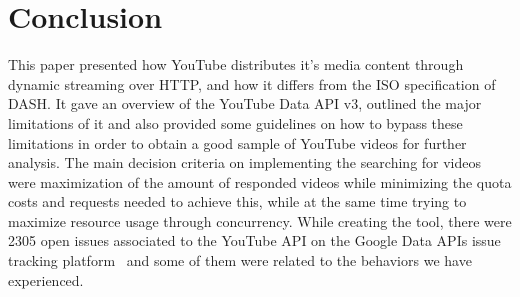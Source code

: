 \section{Conclusion}
This paper presented how
YouTube distributes it's media content through dynamic streaming over HTTP, and how it
differs from the ISO specification of DASH. It gave an overview of the YouTube
Data API v3, outlined the major limitations of it and also provided some
guidelines on how to bypass these limitations in order to obtain a good sample
of YouTube videos for further analysis. The main decision criteria on
implementing the searching for videos were maximization of the amount of
responded videos while minimizing the quota costs and requests needed to achieve
this, while at the same time trying to maximize resource usage through
concurrency. While creating the tool, there were 2305 open issues associated to
the YouTube API on the Google Data APIs issue tracking
platform~\cite{conclusion:gdataissue} and some of them were related to the
behaviors we have experienced.
